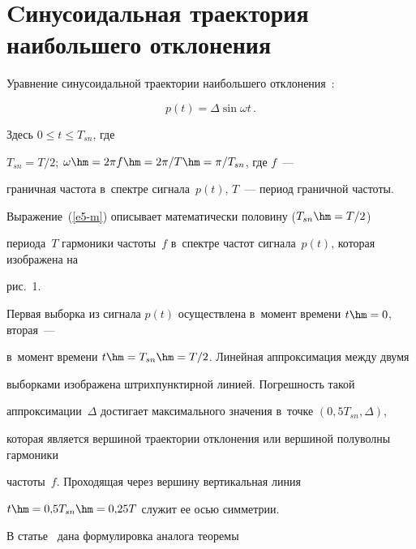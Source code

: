   


  \section{Cинусоидальная траектория наибольшего отклонения}


  


  Уравнение синусоидальной траектории наибольшего отклонения~\cite{17-m, 18-m, 19-m}:


  \begin{equation}


  p(t)=\Delta \sin\omega t\,.


  \label{e5-m}


  \end{equation}


Здесь $0\leq t\leq T_{sn}$, где


$T_{sn}=T/2$; $\omega\hm=2\pi f\hm= 2\pi/T\hm= \pi/T_{sn}$, где $f$~---


граничная частота в~спектре сигнала~$p(t)$, $T$~--- период граничной частоты.


  


  Выражение~(\ref{e5-m}) описывает математически половину ($T_{sn}\hm=T/2$) 


периода~$T$ гармоники частоты~$f$ в~спектре частот сигнала~$p(t)$, которая изображена на 


рис.~1.


  


  Первая выборка из сигнала $p(t)$ осуществлена в~момент времени $t\hm=0$, вторая~--- 


в~момент времени $t\hm=T_{sn}\hm=T/2$. Линейная аппроксимация между двумя 


выборками изображена штрихпунктирной линией. Погрешность такой 


аппроксимации~$\Delta$ достигает максимального значения в~точке $(0{,}5T_{sn}, \Delta)$, 


которая является вершиной траектории отклонения или вершиной полуволны гармоники 


частоты~$f$. Проходящая через вершину вертикальная линия 


$t\hm=0{,}5T_{sn}\hm=0{,}25T$ служит ее осью симметрии.


  


  В статье~\cite{18-m} дана формулировка аналога теоремы  


